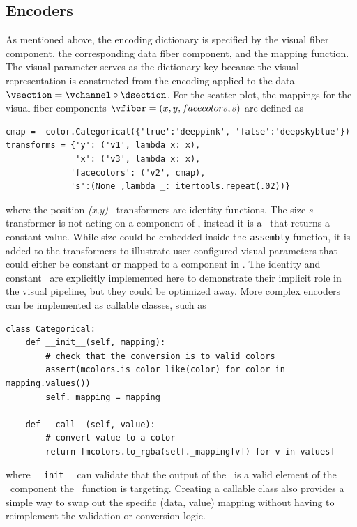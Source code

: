 \documentclass[../main.tex]{subfiles}
\begin{document}
\subsection{Encoders \vchannel}
\label{sec:code_channels}
As mentioned above, the encoding dictionary is specified by the visual fiber component, the corresponding data fiber component, and the mapping function. The visual parameter serves as the dictionary key because the visual representation is constructed from the encoding applied to the data  $\vsection = \vchannel \circ \dsection$. For the scatter plot, the mappings for the visual fiber components $\vfiber=(x,y, facecolors, s)$ are defined as
\begin{verbatim}
cmap =  color.Categorical({'true':'deeppink', 'false':'deepskyblue'})
transforms = {'y': ('v1', lambda x: x),       
              'x': ('v3', lambda x: x),
             'facecolors': ('v2', cmap), 
             's':(None ,lambda _: itertools.repeat(.02))}
\end{verbatim}
where the position \textit{(x,y)} \vchannel\ transformers are identity functions. The size \textit{s} transformer is not acting on a component of \dfiber, instead it is a \vchannel\ that returns a constant value. While size could be embedded inside the \texttt{assembly} function, it is added to the transformers to illustrate user configured visual parameters that could either be constant or mapped to a component in \dfiber. The identity and constant \vchannel\ are explicitly implemented here to demonstrate their implicit role in the visual pipeline, but they could be optimized away. More complex encoders can be implemented as callable classes, such as 
\begin{verbatim}
class Categorical:
    def __init__(self, mapping):
        # check that the conversion is to valid colors
        assert(mcolors.is_color_like(color) for color in mapping.values())
        self._mapping = mapping

    def __call__(self, value):
        # convert value to a color
        return [mcolors.to_rgba(self._mapping[v]) for v in values]
\end{verbatim}

where \texttt{__init__} can validate that the output of the \vchannel\ is a valid element of the \vfiber\ component the \vchannel\ function is targeting. Creating a callable class also provides a simple way to swap out the specific (data, value) mapping without having to reimplement the validation or conversion logic. 
\end{document}
